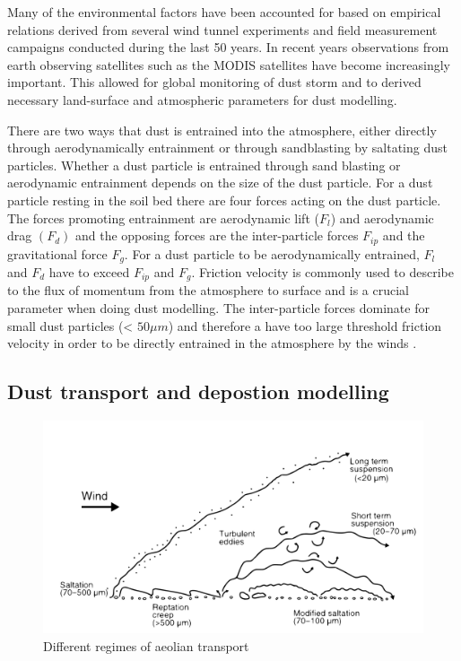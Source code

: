 Many of the environmental factors have been accounted for based on empirical relations derived from several wind tunnel experiments and field measurement campaigns conducted during the last 50 years. In recent years observations from earth observing satellites such as the MODIS satellites have become increasingly important. This allowed for global monitoring of dust storm and to derived necessary land-surface and atmospheric parameters for dust modelling.    

There are two ways that dust is entrained into the atmosphere, either directly through aerodynamically entrainment or through sandblasting by saltating dust particles. Whether a dust particle is entrained through sand blasting or aerodynamic entrainment depends on the size of the dust particle. For a dust particle resting in the soil bed there are four forces acting on the dust particle. The forces promoting entrainment are aerodynamic lift ($F_l$) and aerodynamic drag $(F_d)$ and the opposing forces are the inter-particle forces $F_{ip}$ and the gravitational force $F_g$. For a dust particle to be aerodynamically entrained, $F_l$ and $F_d$ have to exceed $F_{ip}$ and $F_g$. Friction velocity is commonly used to describe to the flux of momentum from the atmosphere to surface and is a crucial parameter when doing dust modelling. The inter-particle forces dominate for small dust particles  (< $50\mu m $) and therefore a have too large threshold friction velocity in order to be directly entrained in the atmosphere by the winds \parencite{kok2012physics}. 

\subsection{Dust transport and depostion modelling}
\begin{figure}[htbp]
  \centering
  \includegraphics[width = \textwidth]{texfiles/figs/aeolian_transport_Parsons_Abrahams.pdf}
  \caption{Different regimes of aeolian transport \parencite{nickling2009aeolian}}
\end{figure}


